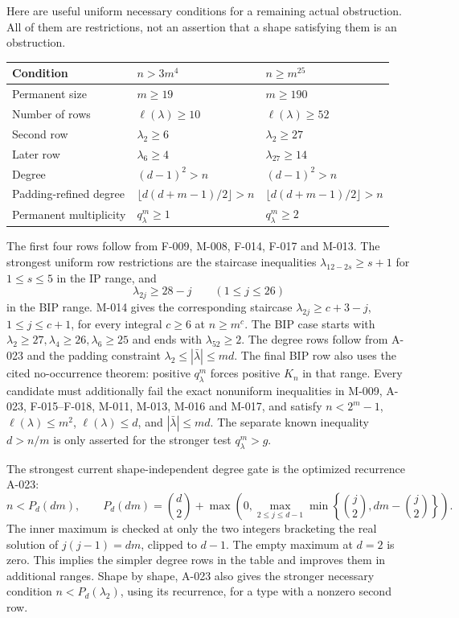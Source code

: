 \documentclass[11pt]{article}
\begin{document}
Here are useful uniform necessary conditions for a remaining
actual obstruction. All of them are restrictions, not an
assertion that a shape satisfying them is an obstruction.
\begin{center}
\renewcommand{\arraystretch}{1.2}
\begin{tabular}{@{}p{}p{}p{}@{}}
\toprule
Condition & \(n>3m^4\) & \(n\geq m^{25}\)\\
\midrule
Permanent size & \(m\geq19\) & \(m\geq190\)\\
Number of rows & \(\ell(\lambda)\geq10\) & \(\ell(\lambda)\geq52\)\\
Second row & \(\lambda_2\geq6\) & \(\lambda_2\geq27\)\\
Later row & \(\lambda_6\geq4\) & \(\lambda_{27}\geq14\)\\
Degree & \((d-1)^2>n\) & \((d-1)^2>n\)\\
Padding-refined degree & \(\lfloor d(d+m-1)/2\rfloor>n\) & \(\lfloor d(d+m-1)/2\rfloor>n\)\\
Permanent multiplicity & \(q^m_\lambda\geq1\) & \(q^m_\lambda\geq2\)\\
\bottomrule
\end{tabular}
\end{center}
The first four rows follow from F-009, M-008, F-014, F-017 and M-013.
The strongest uniform row restrictions are the staircase inequalities
\(\lambda_{12-2s}\geq s+1\) for \(1\leq s\leq5\) in
the IP range, and
\[
                  \lambda_{2j}\geq28-j\qquad(1\leq j\leq26)
\]
in the BIP range. M-014 gives the corresponding staircase
\(\lambda_{2j}\geq c+3-j\), \(1\leq j\leq c+1\),
for every integral \(c\geq6\) at \(n\geq m^c\).
The BIP case starts with
\(\lambda_2\geq27,\lambda_4\geq26,\lambda_6\geq25\)
and ends with \(\lambda_{52}\geq2\). The degree rows follow
from A-023 and the padding constraint
\(\lambda_2\leq|\bar\lambda|\leq md\). The final BIP
row also uses the cited no-occurrence theorem: positive
\(q^m_\lambda\) forces positive \(K_n\) in that range.
Every candidate must additionally fail the exact nonuniform
inequalities in M-009, A-023, F-015--F-018, M-011, M-013, M-016 and M-017,
and satisfy \(n<2^m-1\), \(\ell(\lambda)\leq m^2\),
\(\ell(\lambda)\leq d\), and \(|\bar\lambda|\leq md\).
The separate known inequality \(d>n/m\) is only asserted
for the stronger test \(q^m_\lambda>g\).

The strongest current shape-independent degree gate is the optimized
recurrence A-023:
\[
 n<P_d(dm),\qquad
 P_d(dm)=\binom d2+
 \max\!\left(0,\max_{2\leq j\leq d-1}
       \min\left\{\binom j2,dm-\binom j2\right\}\right).
\]
The inner maximum is checked at only the two integers bracketing
the real solution of \(j(j-1)=dm\), clipped to \(d-1\).
The empty maximum at \(d=2\) is zero. This implies the simpler
degree rows in the table and improves them in additional ranges.
Shape by shape, A-023 also gives the stronger necessary condition
\(n<P_d(\lambda_2)\), using its recurrence, for a type with a
nonzero second row.
\end{document}
